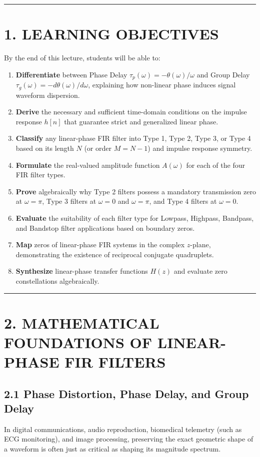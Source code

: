 \documentclass[11pt,a4paper]{article}
\begin{document}
\noindent\rule{\textwidth}{0.5pt}

\section{1. LEARNING OBJECTIVES}
By the end of this lecture, students will be able to:
\begin{enumerate}
    \item \textbf{Differentiate} between Phase Delay $\tau_p(\omega) = -\theta(\omega)/\omega$ and Group Delay $\tau_g(\omega) = -d\theta(\omega)/d\omega$, explaining how non-linear phase induces signal waveform dispersion.
    \item \textbf{Derive} the necessary and sufficient time-domain conditions on the impulse response $h[n]$ that guarantee strict and generalized linear phase.
    \item \textbf{Classify} any linear-phase FIR filter into Type 1, Type 2, Type 3, or Type 4 based on its length $N$ (or order $M = N-1$) and impulse response symmetry.
    \item \textbf{Formulate} the real-valued amplitude function $A(\omega)$ for each of the four FIR filter types.
    \item \textbf{Prove} algebraically why Type 2 filters possess a mandatory transmission zero at $\omega = \pi$, Type 3 filters at $\omega = 0$ and $\omega = \pi$, and Type 4 filters at $\omega = 0$.
    \item \textbf{Evaluate} the suitability of each filter type for Lowpass, Highpass, Bandpass, and Bandstop filter applications based on boundary zeros.
    \item \textbf{Map} zeros of linear-phase FIR systems in the complex $z$-plane, demonstrating the existence of reciprocal conjugate quadruplets.
    \item \textbf{Synthesize} linear-phase transfer functions $H(z)$ and evaluate zero constellations algebraically.
\end{enumerate}

\noindent\rule{\textwidth}{0.5pt}

\section{2. MATHEMATICAL FOUNDATIONS OF LINEAR-PHASE FIR FILTERS}

\subsection{2.1 Phase Distortion, Phase Delay, and Group Delay}
In digital communications, audio reproduction, biomedical telemetry (such as ECG monitoring), and image processing, preserving the exact geometric shape of a waveform is often just as critical as shaping its magnitude spectrum. 
\end{document}
